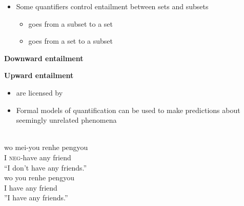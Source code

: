 \documentclass[a4paper,landscape,headrule,footrule,xetex]{foils}
\begin{document}

\begin{itemize}
\item Some quantifiers control entailment between sets and subsets
  \begin{itemize}
  \item {} goes from a subset to a set
  \item {} goes from a set to a subset
  \end{itemize}
\end{itemize}

\begin{exe}
  \ex
  \begin{xlist}
    \ex {} \ent  {}
    \ex {} \nent  {}
    \trans \textbf{Downward entailment}
    \end{xlist}
    \ex
  \begin{xlist}
    \ex {} \nent  {}
    \ex {} \ent  {}
    \trans \textbf{Upward entailment}
    \end{xlist}
  \end{exe}
  \begin{itemize}
  \item {} are licensed by 
  \item Formal models of quantification can be used to make predictions
    about seemingly unrelated phenomena
\end{itemize}



\begin{exe}
\ex \glll {}      \\
        {} wo mei-you  renhe pengyou    \\
        {} I   \textsc{neg}-have any     friend \\
\trans ``I don't have any friends.''
\ex \glll *     \\
        {} wo you  renhe pengyou    \\
        {} I  have any     friend \\
\trans *''I have any friends.''
\end{exe}
\end{document}
